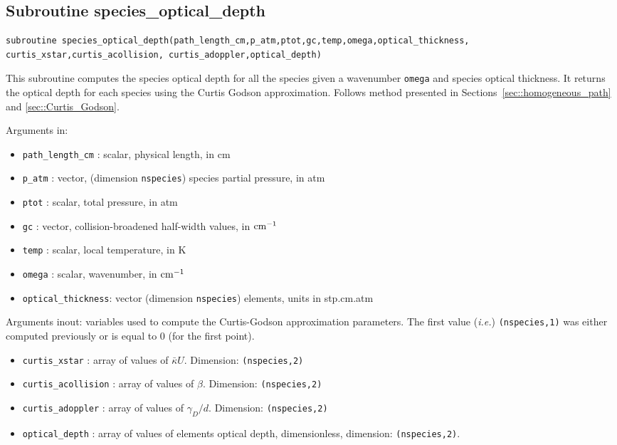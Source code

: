\subsection{Subroutine species\_optical\_depth}
\label{sub:species_optical_depth}

\begin{lstlisting}
subroutine species_optical_depth(path_length_cm,p_atm,ptot,gc,temp,omega,optical_thickness,
curtis_xstar,curtis_acollision, curtis_adoppler,optical_depth)
\end{lstlisting}
This subroutine computes the species optical depth for all the species given a wavenumber \verb=omega= and species optical thickness.
It returns the optical depth for each species using the Curtis Godson approximation. Follows method presented in Sections~\ref{sec::homogeneous_path} and \ref{sec::Curtis_Godson}.

Arguments in:
\begin{itemize}
 \item \verb=path_length_cm= : scalar, physical length, in cm
 \item \verb=p_atm=           : vector, (dimension \verb=nspecies=) species partial pressure, in atm
 \item \verb=ptot=             : scalar, total pressure, in atm
 \item \verb=gc=               : vector, collision-broadened half-width values, in $\rm cm^{-1}$
 \item \verb=temp=             : scalar, local temperature, in K
 \item \verb=omega=            : scalar, wavenumber, in $\rm cm^{-1}$
 \item \verb=optical_thickness=: vector (dimension \verb=nspecies=) elements, units in stp.cm.atm
\end{itemize}

Arguments inout:
 variables used to compute the Curtis-Godson approximation parameters. The first value (\textit{i.e.}) \verb=(nspecies,1)= was either computed previously or is equal to 0 (for the first point).
\begin{itemize}
 \item \verb=curtis_xstar=      : array of values of $\bar{\kappa}U$. Dimension: \verb=(nspecies,2)=
 \item \verb=curtis_acollision= : array of values of $\beta$. Dimension: \verb=(nspecies,2)=
 \item \verb=curtis_adoppler=   : array of values of $\gamma_D/d$. Dimension: \verb=(nspecies,2)=
 \item \verb=optical_depth=     : array of values of elements optical depth, dimensionless, dimension: \verb=(nspecies,2)=.
\end{itemize}

